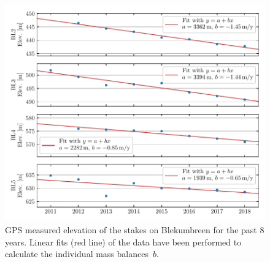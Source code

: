 \begin{figure}[h]
    \centering
    \includegraphics[width=\textwidth]{./figs/Elevation_Blekumbreen.pdf}
    \caption{GPS measured elevation of the stakes on Blekumbreen for the past 8 years.
    Linear fits (red line) of the data have been performed to calculate the individual mass balances~$b$.}
    \label{GPS:fig:elev_ble}
\end{figure}



